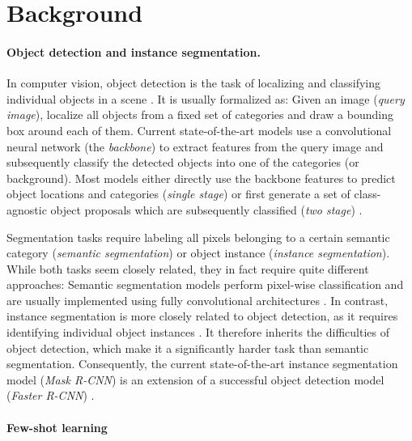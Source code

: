 \documentclass{article}
\begin{document}
\section{Background}

\paragraph{Object detection and instance segmentation.}

In computer vision, object detection is the task of localizing and classifying individual objects in a scene \cite{Everingham2010}. It is usually formalized as: Given an image (\emph{query image}), localize all objects from a fixed set of categories and draw a bounding box around each of them. Current state-of-the-art models use a convolutional neural network (the \emph{backbone}) to extract features from the query image and subsequently classify the detected objects into one of the  categories (or background). Most models either directly use the backbone features to predict object locations and categories (\emph{single stage}) \cite{Liu2016, Redmon2016, Redmon2017, Redmon2018, Lin2017b} or first generate a set of class-agnostic object proposals which are subsequently classified (\emph{two stage}) \cite{Girshick2014, Girshick2015, Ren2015, He2017}.

Segmentation tasks require labeling all pixels belonging to a certain semantic category (\emph{semantic segmentation}) or object instance (\emph{instance segmentation}). While both tasks seem closely related, they in fact require quite different approaches: Semantic segmentation models perform pixel-wise classification and are usually implemented using fully convolutional architectures \cite{Long2015, Noh2015, Ronneberger2015, Zhao2017, Chen2018b}.
In contrast, instance segmentation is more closely related to object detection, as it requires identifying individual object instances \cite{Hariharan2014, Dai2015, Pinheiro2015, Ren2017, He2017}. It therefore inherits the difficulties of object detection, which make it a significantly harder task than semantic segmentation. Consequently, the current state-of-the-art instance segmentation model (\emph{Mask R-CNN}) \cite{He2017} is an extension of a successful object detection model (\emph{Faster R-CNN}) \cite{Ren2015}.

\paragraph{Few-shot learning}
\end{document}
